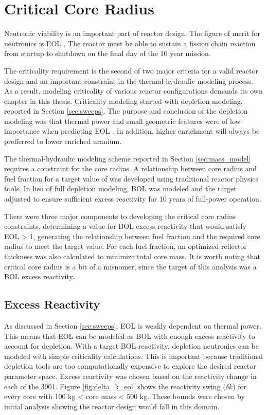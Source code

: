 \section{Critical Core Radius}\label{crit_radius}

Neutronic viability is an important part of reactor design. The figure of merit
for neutronics is EOL \keff. The reactor must be able to sustain a fission
chain reaction from startup to shutdown on the final day of the 10 year mission.

The criticality requirement is the second of two major criteria for a valid reactor design and an
important constraint in the thermal hydraulic modeling process. As a result,
modeling criticality of various reactor configurations demands its own chapter
in this thesis. Criticality modeling started with depletion modeling, reported
in Section \ref{sec:sweeps}. The purpose and conclusion of the depletion
modeling was that thermal power and small geometric features were of low
importance when predicting EOL \keff. In addition, higher enrichment will always
be prefferred to lower enriched uranium.

The thermal-hydraulic modeling scheme
reported in Section \ref{sec:mass_model} requires a constraint for the core
radius. A relationship between core radius and fuel fraction for a target
value of \keff was developed using traditional reactor physics tools. In lieu of
full depletion modeling, BOL \keff was modeled and the \keff target adjusted to
ensure sufficient excess reactivity for 10 years of full-power operation.

There were three major components to developing the critical core radius
constraints, determining a value for BOL excess reactivity that would satisfy
EOL \keff > 1, generating the relationship between fuel fraction and the
required core radius to meet the target \keff value. For each fuel fraction, an
optimized reflector thickness was also calculated to minimize total core mass.
It is worth noting that critical core radius is a
bit of a misnomer, since the target of this analysis was a BOL excess
reactivity.

\subsection{Excess Reactivity}
As discussed in Section \ref{sec:sweeps}, EOL \keff is weakly dependent on
thermal power. This means that EOL \keff can be modeled as BOL \keff with enough
excess reactivity to account for depletion. With a target BOL reactivity,
depletion neutronics can be modeled with simple criticality calculations. This
is important because traditional depletion tools are too computationally
expensive to explore the desired reactor parameter space. Excess reactivity was
chosen based on the reactivity change in each of the 3901. Figure
\ref{fig:delta_k_eol} shows the reactivity swing $(\delta k$) for every core
with 100 kg < core mass < 500 kg. These bounds were chosen by initial analysis
showing the reactor design would fall in this domain.

